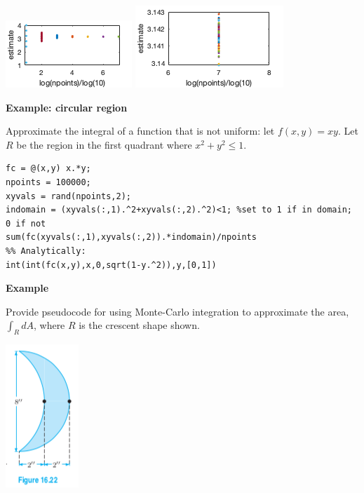 \documentclass[12pt,letterpaper,noanswers]{exam}
\begin{document}
\includegraphics{img/C15Mpi.png}
\includegraphics{img/C15MCpi7.png}
\vspace{0.1cm}

\noindent\textbf{Example: circular region}

Approximate the integral of a function that is not uniform: let $f(x,y) = xy$.  Let $R$ be the region in the first quadrant where $x^2+y^2\leq 1$.

\begin{lstlisting}
fc = @(x,y) x.*y;
npoints = 100000;
xyvals = rand(npoints,2);
indomain = (xyvals(:,1).^2+xyvals(:,2).^2)<1; %set to 1 if in domain; 0 if not
sum(fc(xyvals(:,1),xyvals(:,2)).*indomain)/npoints
%% Analytically:
int(int(fc(x,y),x,0,sqrt(1-y.^2)),y,[0,1])
\end{lstlisting}

\vspace{1in}

\noindent\textbf{Example}

Provide pseudocode for using Monte-Carlo integration to approximate the area, $\int_R dA$, where $R$ is the crescent shape shown. %

\includegraphics[scale=0.65]{img/C16crescent.png}
\end{document}
